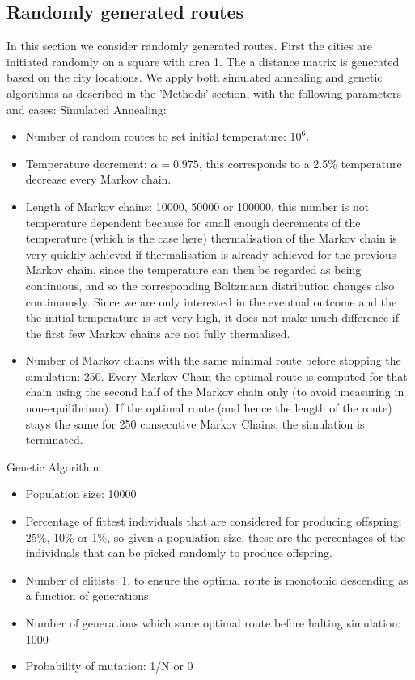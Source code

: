 \documentclass[10pt,a4paper]{article}
\begin{document}
\subsection{Randomly generated routes}
In this section we consider randomly generated routes. First the cities are initiated randomly on a square with area 1. The a distance matrix is generated based on the city locations. We apply both simulated annealing and genetic algorithms as described in the 'Methods'  section, with the following parameters and cases:
\newline
Simulated Annealing:
\begin{itemize}
\item 
  Number of random routes to set initial temperature: $10^6$.
\item
  Temperature decrement: $\alpha = 0.975$, this corresponds to a 2.5\% temperature decrease every Markov chain.
\item
  Length of Markov chains: 10000, 50000 or 100000, this number is not temperature dependent because for small enough decrements of the temperature (which is the case here) thermalisation of the Markov chain is very quickly achieved if thermalisation is already achieved for the previous Markov chain, since the temperature can then be regarded as being continuous, and so the corresponding Boltzmann distribution changes also continuously. Since we are only interested in the eventual outcome and the the initial temperature is set very high, it does not make much difference if the first few Markov chains are not fully thermalised.
\item
  Number of Markov chains with the same minimal route before stopping the simulation: 250. Every Markov Chain the optimal route is computed for that chain using the second half of the Markov chain only (to avoid measuring in non-equilibrium). If the optimal route (and hence the length of the route) stays the same for 250 consecutive Markov Chains, the simulation is terminated.
\end{itemize}
Genetic Algorithm:
\begin{itemize}
\item 
  Population size: 10000
\item
  Percentage of fittest individuals that are considered for producing offspring: 25\%, 10\% or 1\%, so given a population size, these are the percentages of the individuals that can be picked randomly to produce offspring.
\item
  Number of elitists: 1, to ensure the optimal route is monotonic descending as a function of generations.
\item
  Number of generations which same optimal route before halting simulation: 1000
\item
  Probability of mutation: 1/N or 0
\end{itemize}
\end{document}
